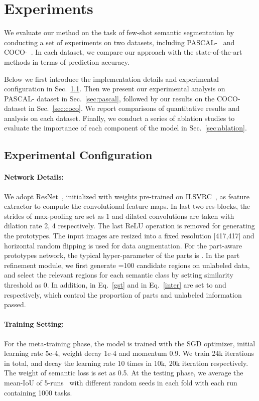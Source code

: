 \documentclass[runningheads]{llncs}
\begin{document}
\section{Experiments}
We evaluate our method on the task of few-shot semantic segmentation by conducting a set of experiments on two datasets, including PASCAL-~\cite{boots2017one} and COCO-~\cite{wang2019panet,nguyen2019feature}. In each dataset, we compare our approach with the state-of-the-art methods in terms of prediction accuracy.

Below we first introduce the implementation details and experimental configuration in Sec.~\ref{sec:config}. Then we present our experimental analysis on PASCAL- dataset in Sec.~\ref{sec:pascal}, followed by our results on the COCO- dataset in Sec.~\ref{sec:coco}. We report comparisons of quantitative results and analysis on each dataset. Finally, we conduct a series of ablation studies to evaluate the importance of each component of the model in Sec.~\ref{sec:ablation}.

\subsection{Experimental Configuration}\label{sec:config}
\paragraph{{\rm \textbf{Network Details:}}}
We adopt ResNet~\cite{he2016deep}, initialized with weights pre-trained on ILSVRC~\cite{russakovsky2015imagenet}, as feature extractor to compute the convolutional feature maps. In last two res-blocks, the strides of max-pooling are set as 1 and dilated convolutions are taken with dilation rate 2, 4 respectively. The last ReLU operation is removed for generating the prototypes. The input images are resized into a fixed resolution [417,417] and horizontal random flipping is used for data augmentation. For the part-aware prototypes network, the typical hyper-parameter of the parts is . In the part refinement module, we first generate =100 candidate regions on unlabeled data, and select the relevant regions for each semantic class by setting similarity threshold  as 0. In addition,   in Eq.~\ref{gst} and  in Eq.~\ref{inter} are set to  and  respectively, which control the proportion of parts and unlabeled information passed.


\paragraph{{\rm \textbf{Training Setting:}}} 
For the meta-training phase, the model is trained with the SGD optimizer, initial learning rate 5e-4, weight decay 1e-4 and momentum 0.9. We train 24k iterations in total, and decay the learning rate 10 times in 10k, 20k iteration respectively. The weight  of semantic loss  is set as 0.5. At the testing phase, we average the mean-IoU of 5-runs~\cite{wang2019panet} with different random seeds in each fold with each run containing 1000 tasks. 
\end{document}
